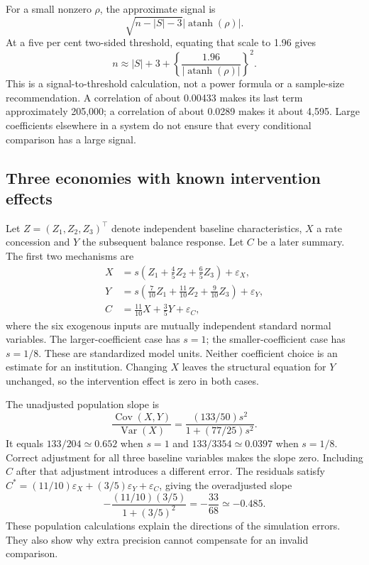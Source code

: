 For a small nonzero $\rho$, the approximate signal is
\[
 \sqrt{n-|S|-3}|\operatorname{atanh}(\rho)|.
\]
At a five per cent two-sided threshold, equating that scale to 1.96 gives
\begin{equation}
 n\approx |S|+3+
 \left\{\frac{1.96}{|\operatorname{atanh}(\rho)|}\right\}^{2}.
 \label{closure30:signal-scale}
\end{equation}
This is a signal-to-threshold calculation, not a power formula or a sample-size
recommendation. A correlation of about 0.00433 makes its last term approximately
205,000; a correlation of about 0.0289 makes it about 4,595. Large coefficients
elsewhere in a system do not ensure that every conditional comparison has a
large signal.

\subsection{Three economies with known intervention effects}

Let $Z=(Z_1,Z_2,Z_3)^\top$ denote independent baseline characteristics,
$X$ a rate concession and $Y$ the subsequent balance response. Let $C$ be a
later summary. The first two mechanisms are
\begin{align}
 X&=s\left(Z_1+\frac45Z_2+\frac65Z_3\right)+\varepsilon_X,\\
 Y&=s\left(\frac7{10}Z_1+\frac{11}{10}Z_2+
                 \frac9{10}Z_3\right)+\varepsilon_Y,\\
 C&=\frac{11}{10}X+\frac35Y+\varepsilon_C,
 \label{closure30:sampling-economy}
\end{align}
where the six exogenous inputs are mutually independent standard normal
variables. The larger-coefficient case has $s=1$; the smaller-coefficient case
has $s=1/8$. These are standardized model units. Neither coefficient choice is
an estimate for an institution. Changing $X$ leaves the structural equation
for $Y$ unchanged, so the intervention effect is zero in both cases.

The unadjusted population slope is
\begin{equation}
 \frac{\operatorname{Cov}(X,Y)}{\operatorname{Var}(X)}
 =\frac{(133/50)s^2}{1+(77/25)s^2}.
 \label{closure30:omitted-slope}
\end{equation}
It equals $133/204\simeq0.652$ when $s=1$ and
$133/3354\simeq0.0397$ when $s=1/8$. Correct adjustment for all three baseline
variables makes the slope zero. Including $C$ after that adjustment introduces
a different error. The residuals satisfy
$C^*=(11/10)\varepsilon_X+(3/5)\varepsilon_Y+\varepsilon_C$, giving the
overadjusted slope
\begin{equation}
 -\frac{(11/10)(3/5)}{1+(3/5)^2}=-\frac{33}{68}\simeq-0.485.
 \label{closure30:later-slope}
\end{equation}
These population calculations explain the directions of the simulation errors.
They also show why extra precision cannot compensate for an invalid comparison.

